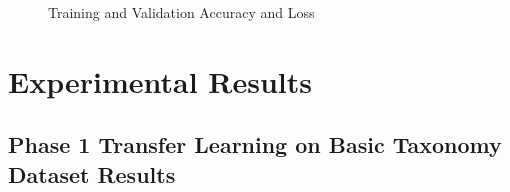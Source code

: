 \documentclass[onecolumn, journal, english, 12pt, a4paper]{IEEEtran} %
\theoremstyle{definition}
\begin{document}
\begin{figure}[h!]
    \centering
    \hfill
    \caption{Training and Validation Accuracy and Loss}
    \label{fig:ModelosDelitosValidadosAccxEpoch}
\end{figure}


\section{Experimental Results}\label{chap:resultados}

\subsection{Phase 1 Transfer Learning on Basic Taxonomy Dataset Results}
\label{sec:phase-1-dataset-results-tl}
\end{document}
